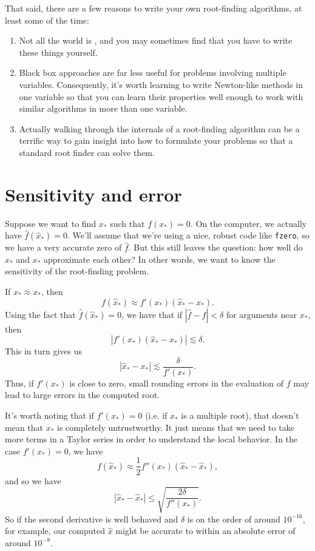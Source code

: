 \documentclass[12pt, leqno]{article}
\begin{document}
That said, there are a few reasons to write your own root-finding
algorithms, at least some of the time:
\begin{enumerate}
\item
  Not all the world is \matlab, and you may sometimes find that you
  have to write these things yourself.
\item
  Black box approaches are far less useful for problems involving
  multiple variables.  Consequently, it's worth learning to write
  Newton-like methods in one variable so that you can learn their
  properties well enough to work with similar algorithms in more than
  one variable.
\item
  Actually walking through the internals of a root-finding algorithm
  can be a terrific way to gain insight into how to formulate your
  problems so that a standard root finder can solve them.
\end{enumerate}

\section*{Sensitivity and error}


Suppose we want to find $x_*$ such that $f(x_*) = 0$.  On the
computer, we actually have $\hat{f}(\hat{x}_*) = 0$.  We'll assume
that we're using a nice, robust code like {\tt fzero}, so we have a
very accurate zero of $\hat{f}$.  But this still leaves the question:
how well do $\hat{x}_*$ and $x_*$ approximate each other?
In other words, we want to know the sensitivity of the root-finding
problem.

If $\hat{x}_* \approx x_*$, then
\[
  f(\hat{x}_*) \approx f'(x_*) (\hat{x}_*-x_*).
\]
Using the fact that $\hat{f}(\hat{x}_*) = 0$, we have that if
$|\hat{f}-f| < \delta$ for arguments near $x_*$, then
\[
  |f'(x_*) (\hat{x}_*-x_*)| \lesssim \delta.
\]
This in turn gives us
\[
  |\hat{x}_*-x_*| \lesssim \frac{\delta}{f'(x_*)}.
\]
Thus, if $f'(x_*)$ is close to zero, small rounding errors in the
evaluation of $f$ may lead to large errors in the computed root.

It's worth noting that if $f'(x_*) = 0$ (i.e. if $x_*$ is a multiple
root), that doesn't mean that $x_*$ is completely untrustworthy.  It
just means that we need to take more terms in a Taylor series in order
to understand the local behavior.  In the case $f'(x_*) = 0$, we have
\[
  f(\hat{x}_*) \approx \frac{1}{2} f''(x_*) (\hat{x}_*-\hat{x}_*),
\]
and so we have
\[
  |\hat{x}_*-\hat{x}_*| \leq \sqrt{\frac{2\delta}{f''(x_*)}}.
\]
So if the second derivative is well behaved and $\delta$ is on the
order of around $10^{-16}$, for example, our computed $\hat{x}$ might
be accurate to within an absolute error of around $10^{-8}$.
\end{document}
